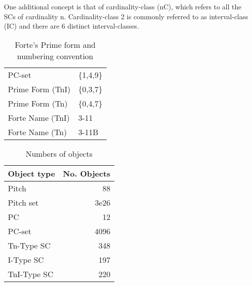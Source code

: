\documentclass{article}
\begin{document}
One additional concept is that of cardinality-class (nC), which refers
to all the SCs of cardinality n. Cardinality-class 2 is commonly
referred to as interval-class (IC) and there are 6 distinct
interval-classes.
\begin{table}[htb]
\caption{Forte's Prime form and numbering convention} 
\begin{center}
\begin{tabular}{ll}
 PC-set            &  \{1,4,9\}  \\
 Prime Form (TnI)  &  \{0,3,7\}  \\
 Prime Form (Tn)   &  \{0,4,7\}  \\
 Forte Name (TnI)  &  3-11       \\
 Forte Name (Tn)   &  3-11B      \\
\end{tabular}
\end{center}
\end{table}


\begin{table}[htb]
\caption{Numbers of objects} 
\begin{center}
\begin{tabular}{lr}
 Object type  &  No. Objects  \\
\hline
 Pitch        &           88  \\
 Pitch set    &         3e26  \\
 PC           &           12  \\
 PC-set       &         4096  \\
 Tn-Type SC   &          348  \\
 I-Type SC    &          197  \\
 TnI-Type SC  &          220  \\
\end{tabular}
\end{center}
\end{table}
\end{document}
